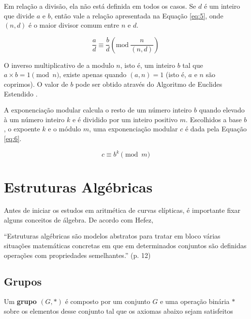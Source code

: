 Em relação a divisão, ela não está definida em todos os casos. Se \(d\) é um inteiro que divide \(a\) e \(b\), então vale a relação apresentada na Equação \ref{eq:5}, onde \((n, d)\) é o maior divisor comum entre \(n\) e \(d\).

\begin{equation}
  \frac{a}{d} \equiv \frac{b}{d}\left(\mbox{mod}\ \frac{n}{(n,d)}\right) \label{eq:5}
\end{equation}

O inverso multiplicativo de a modulo \(n\), isto é, um inteiro \(b\) tal que \(a \times b = 1 \pmod  n\), existe apenas quando \((a, n) = 1\) (isto é, \(a\) e \(n\) são coprimos). O valor de \(b\) pode ser obtido através do Algoritmo de Euclides Estendido \cite{Halim:2013}.
\par A exponenciação modular calcula o resto de um número inteiro \(b\) quando elevado à um número inteiro \(k\) e é dividido por um inteiro positivo \(m\). Escolhidos a base \(b\), o expoente \(k\) e o módulo \(m\), uma exponenciação modular \(c\) é dada pela Equação \ref{eq:6}.

\begin{equation}
  c \equiv b^k\pmod m \label{eq:6}
\end{equation}

%
%
\section{Estruturas Algébricas}

Antes de iniciar os estudos em aritmética de curvas elípticas, é importante
fixar alguns conceitos de álgebra. De acordo com Hefez,

\begin{citacao}
``Estruturas algébricas são modelos abstratos para tratar em bloco várias situações matemáticas concretas em que em determinados conjuntos são definidas operações com propriedades semelhantes.'' \cite{Hefez:2008} (p. 12)
\end{citacao}

%
%
\subsection{Grupos}

Um \textbf{grupo \((G,*)\)} é composto por um conjunto \(G\) e uma operação binária \(*\) sobre os elementos desse conjunto tal que os axiomas abaixo sejam satisfeitos \cite{Gilbert:2004}

